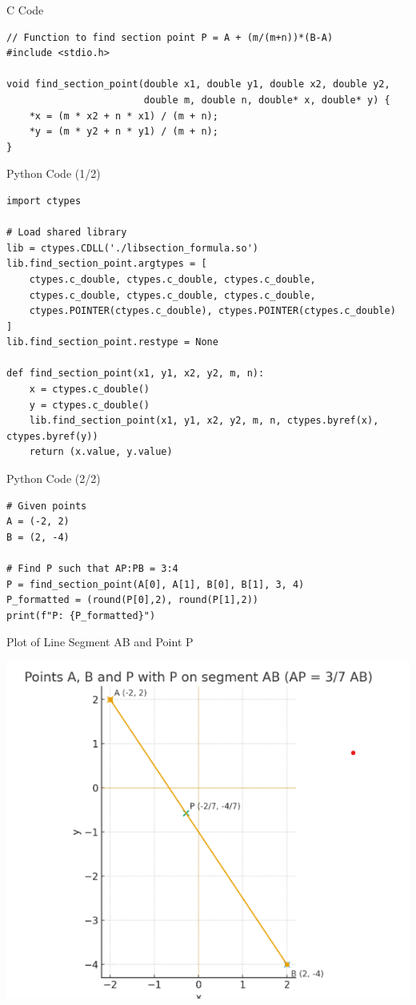 \documentclass{beamer}
\begin{document}
\begin{frame}[fragile]{C Code}
\begin{verbatim}
// Function to find section point P = A + (m/(m+n))*(B-A)
#include <stdio.h>

void find_section_point(double x1, double y1, double x2, double y2, 
                        double m, double n, double* x, double* y) {
    *x = (m * x2 + n * x1) / (m + n);
    *y = (m * y2 + n * y1) / (m + n);
}
\end{verbatim}
\end{frame}

\begin{frame}[fragile]{Python Code (1/2)}
\begin{verbatim}
import ctypes

# Load shared library
lib = ctypes.CDLL('./libsection_formula.so')
lib.find_section_point.argtypes = [
    ctypes.c_double, ctypes.c_double, ctypes.c_double,
    ctypes.c_double, ctypes.c_double, ctypes.c_double,
    ctypes.POINTER(ctypes.c_double), ctypes.POINTER(ctypes.c_double)
]
lib.find_section_point.restype = None

def find_section_point(x1, y1, x2, y2, m, n):
    x = ctypes.c_double()
    y = ctypes.c_double()
    lib.find_section_point(x1, y1, x2, y2, m, n, ctypes.byref(x), ctypes.byref(y))
    return (x.value, y.value)
\end{verbatim}
\end{frame}

\begin{frame}[fragile]{Python Code (2/2)}
\begin{verbatim}
# Given points
A = (-2, 2)
B = (2, -4)

# Find P such that AP:PB = 3:4
P = find_section_point(A[0], A[1], B[0], B[1], 3, 4)
P_formatted = (round(P[0],2), round(P[1],2))
print(f"P: {P_formatted}")
\end{verbatim}
\end{frame}

\begin{frame}{Plot of Line Segment AB and Point P}
\begin{center}
\includegraphics[width=0.6\columnwidth]{figs/fig1.png}
\end{center}
\end{frame}
\end{document}
